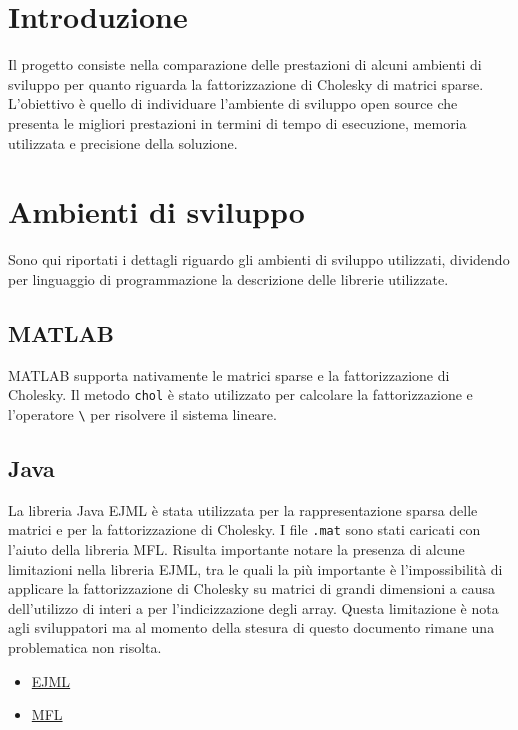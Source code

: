 \documentclass{report}
\begin{document}
    
    \chapter*{Introduzione}
        Il progetto consiste nella comparazione delle prestazioni di alcuni ambienti di sviluppo per quanto riguarda
        la fattorizzazione di Cholesky di matrici sparse.\\
        L'obiettivo è quello di individuare l'ambiente di sviluppo open source che presenta le migliori prestazioni
        in termini di tempo di esecuzione, memoria utilizzata e precisione della soluzione.\\

    \chapter[Enviroments]{Ambienti di sviluppo}
        Sono qui riportati i dettagli riguardo gli ambienti di sviluppo utilizzati, 
        dividendo per linguaggio di programmazione la descrizione delle librerie utilizzate.

        \section{MATLAB}
            MATLAB supporta nativamente le matrici sparse e la fattorizzazione di Cholesky.
            Il metodo \texttt{chol} è stato utilizzato per calcolare la fattorizzazione e
            l'operatore \verb$\$ per risolvere il sistema lineare.

        \section{Java}
            La libreria Java EJML è stata utilizzata per la rappresentazione sparsa delle matrici
            e per la fattorizzazione di Cholesky.
            I file \texttt{.mat} sono stati caricati con l'aiuto della libreria MFL.
            Risulta importante notare la presenza di alcune limitazioni nella libreria EJML,
            tra le quali la più importante è l'impossibilità di applicare la fattorizzazione di Cholesky
            su matrici di grandi dimensioni a causa dell'utilizzo di interi a per l'indicizzazione degli array.
            Questa limitazione è nota agli sviluppatori ma al momento della stesura di questo documento rimane
            una problematica non risolta.

            \begin{itemize}
                \item \href{http://ejml.org/}{EJML}
                \item \href{https://github.com/HebiRobotics/MFL}{MFL}
            \end{itemize}
            
\end{document}
